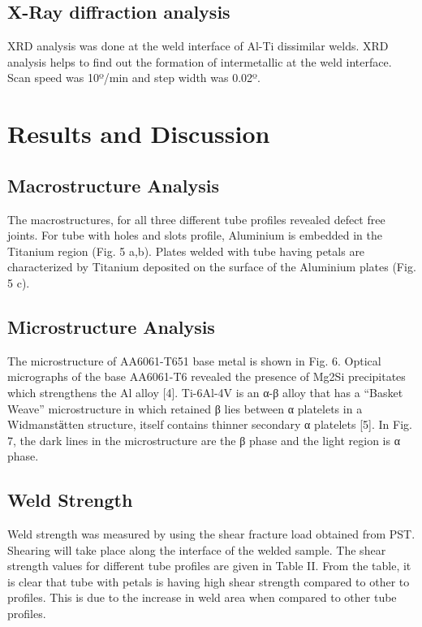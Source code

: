 \documentclass[preprint]{elsarticle}
\begin{document}
\subsection{X-Ray diffraction analysis}
\label{subsec:XRD}
XRD analysis was done at the weld interface of Al-Ti dissimilar welds. XRD analysis helps to find out the formation of intermetallic at the weld interface. Scan speed was 10º/min and step width was 0.02º.

\section{Results and Discussion}
\label{sec:Results and Discussion}

\subsection{Macrostructure Analysis}
\label{subsec:Macrostructure Analysis}
The macrostructures, for all three different tube profiles revealed defect free joints. For tube with holes and slots profile, Aluminium is embedded in the Titanium region (Fig. 5 a,b). Plates welded with tube having petals are characterized by Titanium deposited on the surface of the Aluminium plates (Fig. 5 c).

\subsection{Microstructure Analysis}
\label{subsec:Macrostructure Analysis}
The microstructure of AA6061-T651 base metal is shown in Fig. 6. Optical micrographs of the base AA6061-T6 revealed the presence of Mg2Si precipitates which strengthens the Al alloy [4]. Ti-6Al-4V is an α-β alloy that has a “Basket Weave” microstructure in which retained β lies between α platelets in a Widmanstӓtten structure, itself contains thinner secondary α platelets [5]. In Fig. 7, the dark lines in the microstructure are
the β phase and the light region is α phase.

\subsection{Weld Strength}
\label{subsec:Weld Strength}
Weld strength was measured by using the shear fracture load obtained from PST. Shearing will take place along the interface of the welded sample. The shear strength values for different tube profiles are given in Table II. From the table, it is clear that tube with petals is having high shear strength compared to other to profiles. This is due to the increase in weld area when compared to other tube profiles.
\end{document}
